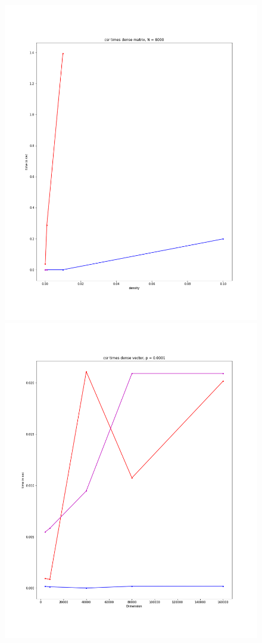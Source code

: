 \documentclass[12pt]{article}
\begin{document}
\begin{figure}[h]
  \includegraphics[scale = 0.16]{csr_dm_8000.png}
  \includegraphics[scale = 0.16]{csr_dv_0001.png}

\end{figure}
\end{document}
